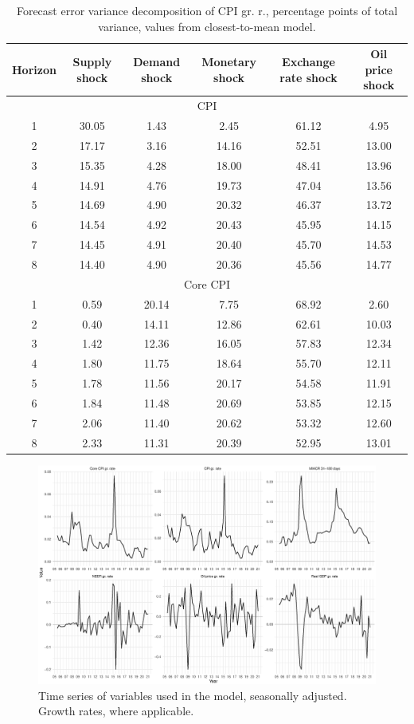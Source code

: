 \documentclass[12pt, a4paper]{extarticle}
\begin{document}
\begin{table}
	\footnotesize
	\begin{tabular}{cccccc}
		\toprule
		Horizon & Supply shock & Demand shock & Monetary shock & Exchange rate shock & Oil price shock\\
		\midrule
		\multicolumn{6}{c}{CPI}\\
		\midrule
		1&30.05 &  1.43 &  2.45 &  61.12  &  4.95\\
		2&17.17  &  3.16 & 14.16 & 52.51  & 13.00\\
		3&15.35 &  4.28 & 18.00 &  48.41 &  13.96\\
		4&14.91  &  4.76 & 19.73 &  47.04  & 13.56\\
		5&14.69  & 4.90 &  20.32 &  46.37 &  13.72\\
		6&14.54  &  4.92 &  20.43 &  45.95 &  14.15\\
		7&14.45  &  4.91 &  20.40 &  45.70  & 14.53\\
		8&14.40  &  4.90 &  20.36 &  45.56 &  14.77\\
		\midrule
		\multicolumn{6}{c}{Core CPI}\\
		\midrule
		1 &	0.59 &  20.14 &   7.75 &  68.92 & 2.60\\
		2 &	0.40 &  14.11  & 12.86 &  62.61 & 10.03\\
		3 &	1.42 &  12.36 & 16.05 & 57.83 & 12.34\\
		4 &	1.80 &  11.75  & 18.64 &  55.70 & 12.11\\
		5 &	1.78 &  11.56  & 20.17 & 54.58 & 11.91\\
		6 &	1.84 &  11.48  & 20.69 & 53.85 & 12.15\\
		7 &	2.06 &  11.40  & 20.62 &  53.32 & 12.60\\
		8 &	2.33 &  11.31  & 20.39 &  52.95 & 13.01\\
		\bottomrule
	\end{tabular}
	\caption{Forecast error variance decomposition of CPI gr. r., percentage points of total variance, values from closest-to-mean model.}
	\label{tab:fevd_cpi}
\end{table}



\begin{figure}
	\centering
	\includegraphics[width=0.9\linewidth]{figures/time_series}
	\caption[]{Time series of variables used in the model, seasonally adjusted. Growth rates, where applicable.}
	\label{fig:timeseries}
\end{figure}
\end{document}

